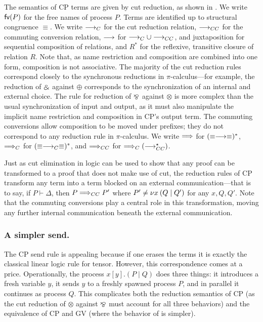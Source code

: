 \documentclass[orivec,envcountsame]{llncs}
\begin{document}
The semantics of CP terms are given by cut reduction, as shown in .  We write
$\mathsf{fv}(P)$ for the free names of process $P$.  Terms are identified up to structural congruence
$\equiv$. We write $\longrightarrow_C$ for the cut reduction relation, $\longrightarrow_{CC}$ for the commuting conversion
relation, $\longrightarrow$ for $\longrightarrow_C \cup \longrightarrow_{CC}$, and juxtaposition for sequential composition of relations,
and $R^*$ for the reflexive, transitive closure of relation $R$. Note that, as name restriction and
composition are combined into one form, composition is not associative.  The majority of the cut
reduction rules correspond closely to the synchronous reductions in $\pi$-calculus---for example,
the reduction of $\mathbin\binampersand$ against $\oplus$ corresponds to the synchronization of an internal and
external choice.  The rule for reduction of $\mathbin\bindnasrepma$ against $\otimes$ is more complex than the usual
synchronization of input and output, as it must also manipulate the implicit name restriction and
composition in CP's output term. The commuting conversions allow composition to be moved under
prefixes; they do not correspond to any reduction rule in $\pi$-calculus. We write $\Longrightarrow$ for
$(\equiv\longrightarrow\equiv)^*$, $\Longrightarrow_C$ for $(\equiv\longrightarrow_C\equiv)^*$, and $\Longrightarrow_{CC}$ for
$\Longrightarrow_C(\longrightarrow_{CC}^\star)$.

Just as cut elimination in logic can be used to show that any proof can be transformed to a proof
that does not make use of cut, the reduction rules of CP transform any term into a term blocked on
an external communication---that is to say, if $P \vdash \Delta$, then $P \Longrightarrow_{CC} P'$ where $P'
\not= \nu x \: (Q \mid Q')$ for any $x,Q,Q'$. Note that the commuting conversions play a central role in
this transformation, moving any further internal communication beneath the external communication.

\subsubsection{A simpler send.}

The CP send rule is appealing because if one erases the terms it is exactly the classical linear
logic rule for tensor. However, this correspondence comes at a price. Operationally, the process
$x[y].(P \mid Q)$ does three things: it introduces a fresh variable $y$, it sends $y$ to a freshly
spawned process $P$, and in parallel it continues as process $Q$.  This complicates both the
reduction semantics of CP (as the cut reduction of $\otimes$ against $\mathbin\bindnasrepma$ must account for all
three behaviors) and the equivalence of CP and GV (where the behavior of  is simpler).
\end{document}
